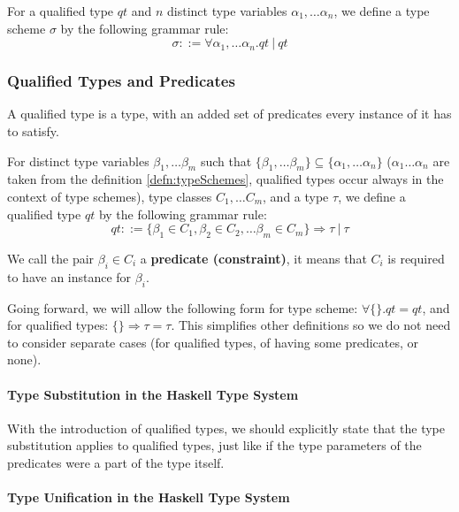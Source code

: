 \begin{defn}
    For a qualified type $qt$ and $n$ distinct type variables $\alpha_1, \dots \alpha_n$, we define a type scheme $\sigma$ by the following grammar rule:
    \label{defn:typeSchemes}
    $$\sigma ::= \forall \alpha_1, \dots \alpha_n . qt\ |\ qt$$
\end{defn}

\subsubsection{Qualified Types and Predicates}

A qualified type is a type, with an added set of predicates every instance of it has to satisfy.

\begin{defn}
    For distinct type variables $\beta_1, \dots \beta_m$ such that $\{\beta_1, \dots \beta_m\} \subseteq \{\alpha_1, \dots \alpha_n\}$ ($\alpha_1 \dots \alpha_n$ are taken from the definition \ref{defn:typeSchemes}, qualified types occur always in the context of type schemes), type classes $C_1, \dots C_m$, and a type $\tau$, we define a qualified type $qt$ by the following grammar rule:
    $$qt ::= \{\beta_1 \in C_1, \beta_2 \in C_2, \dots \beta_m \in C_m\} \Rightarrow \tau\ |\ \tau$$

    We call the pair $\beta_i \in C_i$ a \textbf{predicate (constraint)}, it means that $C_i$ is required to have an instance for $\beta_i$.
\end{defn}

Going forward, we will allow the following form for type scheme: $\forall \{\}. qt = qt$, and for qualified types: $\{\} \Rightarrow \tau = \tau$. This simplifies other definitions so we do not need to consider separate cases (for qualified types, of having some predicates, or none).

\paragraph{Type Substitution in the Haskell Type System}

With the introduction of qualified types, we should explicitly state that the type substitution applies to qualified types, just like if the type parameters of the predicates were a part of the type itself.

\paragraph{Type Unification in the Haskell Type System}

